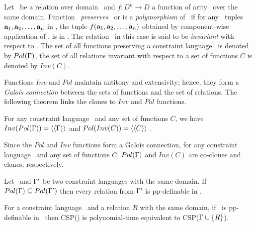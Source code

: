 Let \mR\ be a relation over domain \mD\ and \(f:D^n\to D\) a function of arity \mn\ over the
same domain. Function \mf\ \emph{preserves} \mR\ or is a \emph{polymorphism} of \mR\ if
for any \mn\ tuples \(\textbf{a}_1,\textbf{a}_2,\dotsc,\textbf{a}_n\) in \mR, the tuple
\(f(\textbf{a}_1,\textbf{a}_2,\dotsc,\textbf{a}_n)\) obtained by component-wise application of \mf,
is in \mR\@. The relation \mR\ in this case is said to be \emph{invariant} with respect 
to \mf\@.
The set of all functions preserving a constraint language \mrelset\ is 
denoted by \(Pol(\Gamma)\), the set of all relations invariant with respect to a set of
functions  \(C\) is denoted by \(Inv(C)\)\@.

Functions \(Inv\) and \(Pol\) maintain
antitony and extensivity; hence, they 
form a \emph{Galois connection} between the sets of functions 
and the set of relations. The following theorem links the clones to \(Inv\) and \(Pol\)
functions.

\begin{theorem}
For any constraint language \mrelset\ and 
any set of functions \(C\), 
we have \(Inv(Pol(\Gamma))=\langle\langle \Gamma \rangle\rangle\)
and
\(Pol(Inv(C))=\langle\langle C \rangle\rangle\)
\@.
\end{theorem}

\begin{cor}
Since the \(Pol\) and \(Inv\) functions form a Galois connection, for any
constraint language \mrelset\ and any set of functions \(C\), 
\(Pol(\Gamma)\) and \(Inv(C)\) are co-clones and clones, respectively.
\end{cor}

\begin{cor}
Let \mrelset\ and \(\Gamma'\) be two constraint languages with the same domain.
If \(Pol(\Gamma) \subseteq Pol(\Gamma')\) then every relation from \(\Gamma'\)  is 
pp-definable in \mrelset\@.
\end{cor}

\begin{theorem}  \label{trm:jeavons}
For a constraint language \mrelset\ and a relation \(R\) with the same domain,
if \mR\ is pp-definable in \mrelset\ then CSP(\mrelset) is polynomial-time equivalent 
to CSP(\(\Gamma \cup \{{R}\}\))\@.
\end{theorem}

